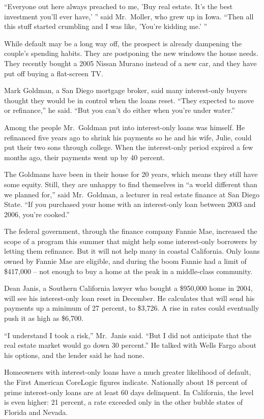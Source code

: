 ﻿\documentclass[12pt]{article}
\begin{document}
``Everyone out here always preached\cite{preach} to me, 'Buy real estate. It's the best investment
you'll ever have,' '' said Mr.~Moller, who grew up in Iowa. ``Then all this stuff started crumbling
and I was like, 'You're kidding me.' ''

While default may be a long way off, the prospect is already dampening the couple's spending habits.
They are postponing the new windows the house needs. They recently bought a 2005 Nissan Murano
instead of a new car, and they have put off buying a flat-screen TV.

Mark Goldman, a San Diego mortgage broker, said many interest-only buyers thought they would be in
control when the loans reset. ``They expected to move or refinance,'' he said. ``But you can't do
either when you're under water.''

Among the people Mr.~Goldman put into interest-only loans was himself. He refinanced five years ago
to shrink his payments so he and his wife, Julie, could put their two sons through college. When the
interest-only period expired a few months ago, their payments went up by 40 percent.

The Goldmans have been in their house for 20 years, which means they still have some equity. Still,
they are unhappy to find themselves in ``a world different than we planned for,'' said Mr.~Goldman,
a lecturer in real estate finance at San Diego State. ``If you purchased your home with an
interest-only loan between 2003 and 2006, you're cooked.''

The federal government, through the finance company Fannie Mae, increased the scope of a program
this summer that might help some interest-only borrowers by letting them refinance. But it will not
help many in coastal California. Only loans owned by Fannie Mae are eligible, and during the boom
Fannie had a limit of \$417,000 -- not enough to buy a home at the peak in a middle-class community.

Dean Janis, a Southern California lawyer who bought a \$950,000 home in 2004, will see his
interest-only loan reset in December. He calculates that will send his payments up a minimum of 27
percent, to \$3,726. A rise in rates could eventually push it as high as \$6,700.

``I understand I took a risk,'' Mr.~Janis said. ``But I did not anticipate that the real estate
market would go down 30 percent.'' He talked with Wells Fargo about his options, and the lender said
he had none.

Homeowners with interest-only loans have a much greater likelihood of default, the First American
CoreLogic figures indicate. Nationally about 18 percent of prime interest-only loans are at least 60
days delinquent. In California, the level is even higher: 21 percent, a rate exceeded only in the
other bubble states of Florida and Nevada.
\end{document}
